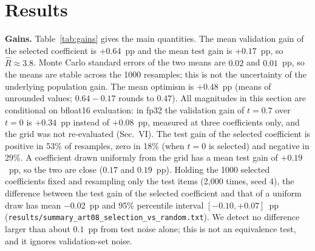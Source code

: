 \documentclass[conference]{IEEEtran}
\begin{document}
\section{Results}
\textbf{Gains.} Table~\ref{tab:gains} gives the main quantities. The mean validation gain of the selected coefficient is $+0.64$~pp and the mean test gain is $+0.17$~pp, so $\hat R\approx 3.8$. Monte Carlo standard errors of the two means are $0.02$ and $0.01$~pp, so the means are stable across the 1000 resamples; this is not the uncertainty of the underlying population gain. The mean optimism is $+0.48$~pp (means of unrounded values; $0.64-0.17$ rounds to $0.47$). All magnitudes in this section are conditional on bfloat16 evaluation: in fp32 the validation gain of $t=0.7$ over $t=0$ is $+0.34$~pp instead of $+0.08$~pp, measured at three coefficients only, and the grid was not re-evaluated (Sec.~VI). The test gain of the selected coefficient is positive in 53\% of resamples, zero in 18\% (when $t=0$ is selected) and negative in 29\%. A coefficient drawn uniformly from the grid has a mean test gain of $+0.19$~pp, so the two are close ($0.17$ and $0.19$~pp). Holding the 1000 selected coefficients fixed and resampling only the test items (2,000 times, seed 4), the difference between the test gain of the selected coefficient and that of a uniform draw has mean $-0.02$~pp and 95\% percentile interval $[-0.10,+0.07]$~pp (\texttt{results/summary\_art08\_selection\_vs\_random.txt}). We detect no difference larger than about $0.1$~pp from test noise alone; this is not an equivalence test, and it ignores validation-set noise.
\end{document}
